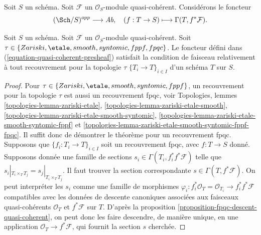 \medskip\noindent
Soit $S$ un schéma.
Soit $\mathcal{F}$ un $\mathcal{O}_S$-module quasi-cohérent.
Considérons le foncteur
\begin{equation}
\label{equation-quasi-coherent-presheaf}
(\Sch/S)^{opp} \longrightarrow \textit{Ab},
\quad
(f : T \to S) \longmapsto \Gamma(T, f^*\mathcal{F}).
\end{equation}

\begin{lemma}
\label{lemma-sheaf-condition-holds}
Soit $S$ un schéma.
Soit $\mathcal{F}$ un $\mathcal{O}_S$-module quasi-cohérent.
Soit $\tau \in \{Zariski, \linebreak[0] \etale, \linebreak[0] smooth,
\linebreak[0] syntomic, \linebreak[0] fppf, \linebreak[0] fpqc\}$.
Le foncteur défini dans (\ref{equation-quasi-coherent-presheaf})
satisfait la condition de faisceau relativement à tout recouvrement
pour la topologie $\tau$
$\{T_i \to T\}_{i \in I}$ d'un schéma $T$ sur $S$.
\end{lemma}

\begin{proof}
Pour $\tau \in \{Zariski, \linebreak[0] \etale, \linebreak[0] smooth,
\linebreak[0] syntomic, \linebreak[0] fppf\}$, un recouvrement pour la topologie $\tau$
est aussi un recouvrement fpqc, voir
Topologies, lemmes
\ref{topologies-lemma-zariski-etale},
\ref{topologies-lemma-zariski-etale-smooth},
\ref{topologies-lemma-zariski-etale-smooth-syntomic},
\ref{topologies-lemma-zariski-etale-smooth-syntomic-fppf} et
\ref{topologies-lemma-zariski-etale-smooth-syntomic-fppf-fpqc}.
Il suffit donc de démontrer le théorème
pour un recouvrement fpqc. Supposons que $\{f_i : T_i \to T\}_{i \in I}$
soit un recouvrement fpqc, avec $f : T \to S$ donné. Supposons
donnée une famille de sections $s_i \in \Gamma(T_i , f_i^*f^*\mathcal{F})$
telle que $s_i|_{T_i \times_T T_j} = s_j|_{T_i \times_T T_j}$.
Il faut trouver la section correspondante $s \in \Gamma(T, f^*\mathcal{F})$.
On peut interpréter les $s_i$ comme une famille de morphismes
$\varphi_i : f_i^*\mathcal{O}_T = \mathcal{O}_{T_i} \to f_i^*f^*\mathcal{F}$
compatibles avec les données de descente canoniques associées aux
faisceaux quasi-cohérents $\mathcal{O}_T$ et $f^*\mathcal{F}$ sur $T$.
D'après la proposition \ref{proposition-fpqc-descent-quasi-coherent},
on peut donc les faire descendre, de manière unique,
en une application $\mathcal{O}_T \to f^*\mathcal{F}$, qui fournit
la section $s$ cherchée.
\end{proof}

